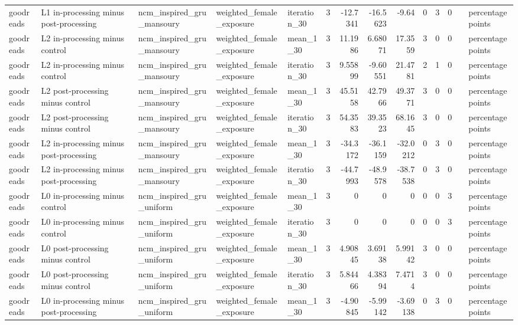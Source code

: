 \begin{table}[htbp!]
\begin{tabular}{lllllrrrrrrrll}
goodreads & L1 in-processing minus post-processing & ncm\_inspired\_gru\_mansoury & weighted\_female\_exposure & iteration\_30 & 3 & -12.7341 & -16.5623 & -9.64 & 0 & 3 & 0 &  & percentage points \\
goodreads & L2 in-processing minus control & ncm\_inspired\_gru\_mansoury & weighted\_female\_exposure & mean\_1\_30 & 3 & 11.1986 & 6.68071 & 17.3559 & 3 & 0 & 0 &  & percentage points \\
goodreads & L2 in-processing minus control & ncm\_inspired\_gru\_mansoury & weighted\_female\_exposure & iteration\_30 & 3 & 9.55899 & -9.60551 & 21.4781 & 2 & 1 & 0 &  & percentage points \\
goodreads & L2 post-processing minus control & ncm\_inspired\_gru\_mansoury & weighted\_female\_exposure & mean\_1\_30 & 3 & 45.5158 & 42.7966 & 49.3771 & 3 & 0 & 0 &  & percentage points \\
goodreads & L2 post-processing minus control & ncm\_inspired\_gru\_mansoury & weighted\_female\_exposure & iteration\_30 & 3 & 54.3583 & 39.3523 & 68.1645 & 3 & 0 & 0 &  & percentage points \\
goodreads & L2 in-processing minus post-processing & ncm\_inspired\_gru\_mansoury & weighted\_female\_exposure & mean\_1\_30 & 3 & -34.3172 & -36.1159 & -32.0212 & 0 & 3 & 0 &  & percentage points \\
goodreads & L2 in-processing minus post-processing & ncm\_inspired\_gru\_mansoury & weighted\_female\_exposure & iteration\_30 & 3 & -44.7993 & -48.9578 & -38.7538 & 0 & 3 & 0 &  & percentage points \\
goodreads & L0 in-processing minus control & ncm\_inspired\_gru\_uniform & weighted\_female\_exposure & mean\_1\_30 & 3 & 0 & 0 & 0 & 0 & 0 & 3 &  & percentage points \\
goodreads & L0 in-processing minus control & ncm\_inspired\_gru\_uniform & weighted\_female\_exposure & iteration\_30 & 3 & 0 & 0 & 0 & 0 & 0 & 3 &  & percentage points \\
goodreads & L0 post-processing minus control & ncm\_inspired\_gru\_uniform & weighted\_female\_exposure & mean\_1\_30 & 3 & 4.90845 & 3.69138 & 5.99142 & 3 & 0 & 0 &  & percentage points \\
goodreads & L0 post-processing minus control & ncm\_inspired\_gru\_uniform & weighted\_female\_exposure & iteration\_30 & 3 & 5.84466 & 4.38394 & 7.4714 & 3 & 0 & 0 &  & percentage points \\
goodreads & L0 in-processing minus post-processing & ncm\_inspired\_gru\_uniform & weighted\_female\_exposure & mean\_1\_30 & 3 & -4.90845 & -5.99142 & -3.69138 & 0 & 3 & 0 &  & percentage points \\

\end{tabular}
\end{table}
